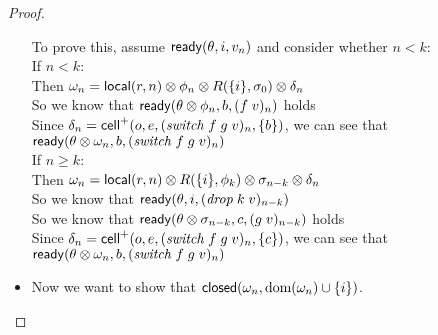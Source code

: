 \begin{proof}
\begin{itemize}
  \begin{tabbedproof}
    \oo To prove this, assume $\mathsf{ready}({\theta}, {i}, {v_n})$ and consider whether $n < k$:\\
    \oo If $n < k$:\\
    \ooo Then $\omega_n = \mathsf{local}({r}, {n}) \otimes \phi_n \otimes R(\{{i}\}, \sigma_0) \otimes \delta_n$ \\
    \ooo So we know that $\mathsf{ready}({\theta \otimes \phi_n}, {b}, {(f\;v)_n})$ holds \\
    \ooo Since $\delta_n = \mathsf{cell}^{+}({o}, {e}, {(\mathit{switch}\;f\;g\;v)_n}, {\{{b}\}})$, we can see that \\
    \ooo $\mathsf{ready}({\theta \otimes \omega_n}, {b}, {(\mathit{switch}\;f\;g\;v)_n})$ \\
    \oo If $n \geq k$: \\
    \ooo Then $\omega_n = \mathsf{local}({r}, {n}) \otimes R(\{{i}\}, \phi_k) \otimes \sigma_{n-k} \otimes \delta_n$ \\
    \ooo So we know that $\mathsf{ready}({\theta}, {i}, {(\mathit{drop}\;k\;v)_{n-k}})$ \\
    \ooo So we know that $\mathsf{ready}({\theta \otimes \sigma_{n-k}}, {c}, {(g\;v)_{n-k}})$ holds \\
    \ooo Since $\delta_n = \mathsf{cell}^{+}({o}, {e}, {(\mathit{switch}\;f\;g\;v)_n}, {\{{c}\}})$, we can see that \\
    \ooo $\mathsf{ready}({\theta \otimes \omega_n}, {b}, {(\mathit{switch}\;f\;g\;v)_n})$ \\
  \end{tabbedproof}

\item Now we want to show that $\mathsf{closed}({\omega_n}, {\mbox{dom}({\omega_n}) \cup \{{i}\}})$. 


\end{itemize}
\end{proof}
